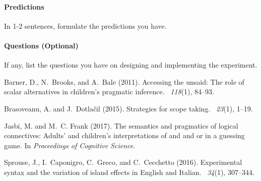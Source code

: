 \documentclass{article}
\begin{document}
\paragraph{Predictions}

In 1-2 sentences, formulate the predictions you have.


\paragraph{Questions (Optional)}

If any, list the questions you have on designing and implementing the experiment.




%


\begin{thebibliography}{}

Barner, D., N.~Brooks, and A.~Bale (2011).
\newblock Accessing the unsaid: The role of scalar alternatives in children's
    pragmatic inference.
~{\em 118\/}(1), 84--93.

Brasoveanu, A. and J.~Dotla{\v{c}}il (2015).
\newblock Strategies for scope taking.
~{\em 23\/}(1), 1--19.

Jasbi, M. and M.~C. Frank (2017).
\newblock The semantics and pragmatics of logical connectives: Adults' and
    children's interpretations of and and or in a guessing game.
\newblock In {\em Proceedings of Cognitive Science}.

Sprouse, J., I.~Caponigro, C.~Greco, and C.~Cecchetto (2016).
\newblock Experimental syntax and the variation of island effects in {E}nglish
    and {I}talian.
~{\em 34\/}(1),
    307--344.

\end{thebibliography}
\end{document}
